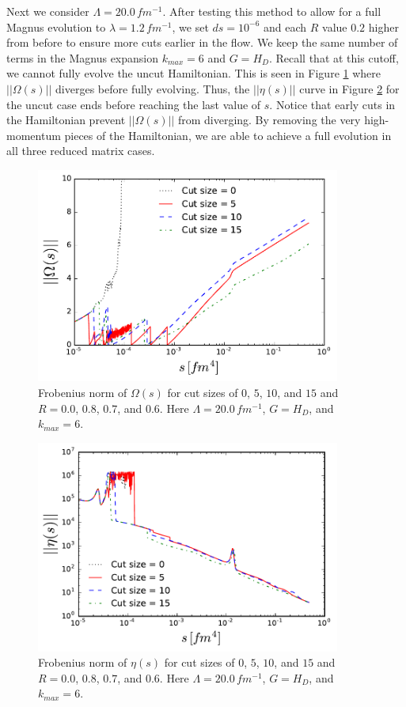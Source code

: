 \documentclass[preprintnumbers,floatfix,aps,prc,preprint]{revtex4-1}
\begin{document}
Next we consider $\Lambda = 20.0 \, fm^{-1}$. After testing this method to allow for a full Magnus evolution to $\lambda = 1.2 \, fm^{-1}$, we set $ds=10^{-6}$ and each $R$ value $0.2$ higher from before to ensure more cuts earlier in the flow. We keep the same number of terms in the Magnus expansion $k_{max} = 6$ and $G=H_D$. Recall that at this cutoff, we cannot fully evolve the uncut Hamiltonian. This is seen in Figure \ref{fig:reduced_matrix_omega_norms_V20} where $||\Omega(s)||$ diverges before fully evolving. Thus, the $||\eta(s)||$ curve in Figure \ref{fig:reduced_matrix_eta_norms_V20} for the uncut case ends before reaching the last value of $s$. Notice that early cuts in the Hamiltonian prevent $||\Omega(s)||$ from diverging. By removing the very high-momentum pieces of the Hamiltonian, we are able to achieve a full evolution in all three reduced matrix cases.
%
\begin{figure}[H]
  \centering
  \includegraphics[width=10cm]{reduced_matrix_omega_norms_V20}
   \hspace*{0.05\textwidth}%
  \caption{Frobenius norm of $\Omega(s)$ for cut sizes of $0$, $5$, $10$, and $15$ and $R=0.0$, $0.8$, $0.7$, and $0.6$. Here $\Lambda=20.0 \, fm^{-1}$, $G=H_D$, and $k_{max}=6$.}
  \label{fig:reduced_matrix_omega_norms_V20}
\end{figure}
%
\begin{figure}[H]
  \centering
  \includegraphics[width=10cm]{reduced_matrix_eta_norms_V20}
   \hspace*{0.05\textwidth}%
  \caption{Frobenius norm of $\eta(s)$ for cut sizes of $0$, $5$, $10$, and $15$ and $R=0.0$, $0.8$, $0.7$, and $0.6$. Here $\Lambda=20.0 \, fm^{-1}$, $G=H_D$, and $k_{max}=6$.}
  \label{fig:reduced_matrix_eta_norms_V20}
\end{figure}
\end{document}

